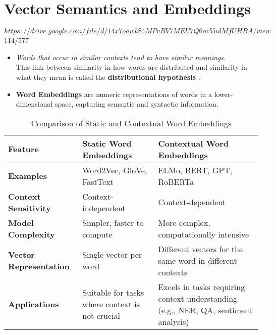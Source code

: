 \chapter{Vector Semantics and Embeddings \cite{nlp-1}}

$https://drive.google.com/file/d/14x7oawk84MPvBV7MEU7Q6ovVudMfUHBA/view$\\
114/577

\begin{itemize}
    \item \textit{Words that occur in similar contexts tend to have similar meanings.}\\ This link between similarity in how words are distributed and similarity in what they mean is called the \textbf{distributional hypothesis}  \label{distributional hypothesis}.

    \item \textbf{Word Embeddings} are numeric representations of words in a lower-dimensional space, capturing semantic and syntactic information. \cite{gfg-word-embeddings-in-nlp}
    
\end{itemize}

\begin{table}[h!]
    \centering
    \begin{tabular}{|p{3cm}|p{5cm}|p{5cm}|}
        \hline
        \textbf{Feature} & \textbf{Static Word Embeddings} & \textbf{Contextual Word Embeddings} \\
        \hline
        \textbf{Examples} & Word2Vec, GloVe, FastText & ELMo, BERT, GPT, RoBERTa \\
        \hline
        \textbf{Context Sensitivity} & Context-independent & Context-dependent \\
        \hline
        \textbf{Model Complexity} & Simpler, faster to compute & More complex, computationally intensive \\
        \hline
        \textbf{Vector Representation} & Single vector per word & Different vectors for the same word in different contexts \\
        \hline
        \textbf{Applications} & Suitable for tasks where context is not crucial & Excels in tasks requiring context understanding (e.g., NER, QA, sentiment analysis) \\
        \hline
    \end{tabular}
    \caption{Comparison of Static and Contextual Word Embeddings \cite{chatgpt}}
\end{table}

